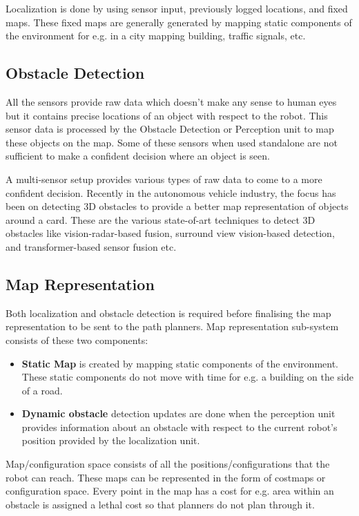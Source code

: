 \documentclass[9pt,a4paper,twoside]{rho-class/rho}
\begin{document}
        Localization is done by using sensor input, previously logged locations, and fixed maps. These fixed maps are generally generated by mapping static components of the environment for e.g. in a city mapping building, traffic signals, etc.

    \subsection{Obstacle Detection}

        All the sensors provide raw data which doesn’t make any sense to human eyes but it contains precise locations of an object with respect to the robot. This sensor data is processed by the Obstacle Detection or Perception unit to map these objects on the map. Some of these sensors when used standalone are not sufficient to make a confident decision where an object is seen. 
        
        A multi-sensor setup provides various types of raw data to come to a more confident decision. Recently in the autonomous vehicle industry, the focus has been on detecting 3D obstacles to provide a better map representation of objects around a card. These are the various state-of-art techniques to detect 3D obstacles like vision-radar-based fusion, surround view vision-based detection, and transformer-based sensor fusion etc.

    \subsection{Map Representation}

        Both localization and obstacle detection is required before finalising the map representation to be sent to the path planners. Map representation sub-system consists of these two components: 
        
\begin{itemize}
    \item \textbf{Static Map} is created by mapping static components of the environment. These static components do not move with time for e.g. a building on the side of a road.
    
    \item \textbf{Dynamic obstacle} detection updates are done when the perception unit provides information about an obstacle with respect to the current robot’s position provided by the localization unit.
\end{itemize}

    Map/configuration space consists of all the positions/configurations that the robot can reach. These maps can be represented in the form of costmaps or configuration space. Every point in the map has a cost for e.g. area within an obstacle is assigned a lethal cost so that planners do not plan through it.
\end{document}
